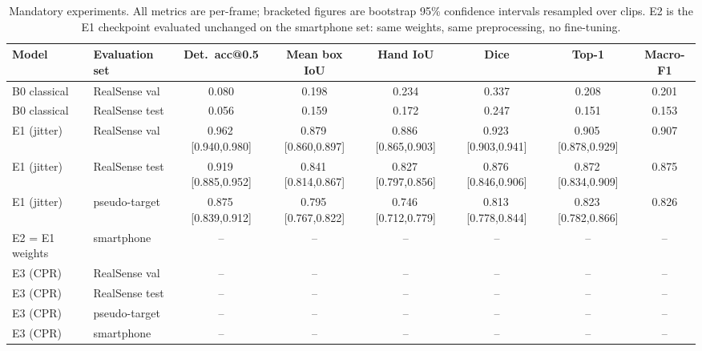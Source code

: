 \begin{table}[t]
\centering
\caption{Mandatory experiments. All metrics are per-frame; bracketed figures are bootstrap 95\% confidence intervals resampled over clips. E2 is the E1 checkpoint evaluated unchanged on the smartphone set: same weights, same preprocessing, no fine-tuning.}
\label{tab:main}
\begin{tabular}{llcccccc}
\toprule
Model & Evaluation set & Det.\ acc@0.5 & Mean box IoU & Hand IoU & Dice & Top-1 & Macro-F1 \\
\midrule
B0 classical & RealSense val & 0.080 & 0.198 & 0.234 & 0.337 & 0.208 & 0.201 \\
B0 classical & RealSense test & 0.056 & 0.159 & 0.172 & 0.247 & 0.151 & 0.153 \\
E1 (jitter) & RealSense val & 0.962\,\tiny[0.940,0.980] & 0.879\,\tiny[0.860,0.897] & 0.886\,\tiny[0.865,0.903] & 0.923\,\tiny[0.903,0.941] & 0.905\,\tiny[0.878,0.929] & 0.907 \\
E1 (jitter) & RealSense test & 0.919\,\tiny[0.885,0.952] & 0.841\,\tiny[0.814,0.867] & 0.827\,\tiny[0.797,0.856] & 0.876\,\tiny[0.846,0.906] & 0.872\,\tiny[0.834,0.909] & 0.875 \\
E1 (jitter) & pseudo-target & 0.875\,\tiny[0.839,0.912] & 0.795\,\tiny[0.767,0.822] & 0.746\,\tiny[0.712,0.779] & 0.813\,\tiny[0.778,0.844] & 0.823\,\tiny[0.782,0.866] & 0.826 \\
E2 = E1 weights & smartphone & -- & -- & -- & -- & -- & -- \\
E3 (CPR) & RealSense val & -- & -- & -- & -- & -- & -- \\
E3 (CPR) & RealSense test & -- & -- & -- & -- & -- & -- \\
E3 (CPR) & pseudo-target & -- & -- & -- & -- & -- & -- \\
E3 (CPR) & smartphone & -- & -- & -- & -- & -- & -- \\
\bottomrule
\end{tabular}
\end{table}
